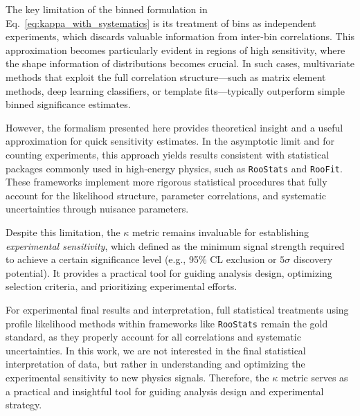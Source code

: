 The key limitation of the binned formulation in Eq.~\ref{eq:kappa_with_systematics} is its treatment of bins as independent experiments, which discards valuable information from inter-bin correlations. This approximation becomes particularly evident in regions of high sensitivity, where the shape information of distributions becomes crucial. In such cases, multivariate methods that exploit the full correlation structure—such as matrix element methods, deep learning classifiers, or template fits—typically outperform simple binned significance estimates.

However, the formalism presented here provides theoretical insight and a useful approximation for quick sensitivity estimates. In the asymptotic limit and for counting experiments, this approach yields results consistent with statistical packages commonly used in high-energy physics, such as \texttt{RooStats} and \texttt{RooFit}. These frameworks implement more rigorous statistical procedures that fully account for the likelihood structure, parameter correlations, and systematic uncertainties through nuisance parameters.


Despite this limitation, the $\kappa$ metric remains invaluable for establishing \textit{experimental sensitivity}, which defined as the minimum signal strength required to achieve a certain significance level (e.g., 95\% CL exclusion or $5\sigma$ discovery potential). It provides a practical tool for guiding analysis design, optimizing selection criteria, and prioritizing experimental efforts. 

For experimental final results and interpretation, full statistical treatments using profile likelihood methods within frameworks like \texttt{RooStats} remain the gold standard, as they properly account for all correlations and systematic uncertainties. In this work, we are not interested in the final statistical interpretation of data, but rather in understanding and optimizing the experimental sensitivity to new physics signals. Therefore, the $\kappa$ metric serves as a practical and insightful tool for guiding analysis design and experimental strategy.
